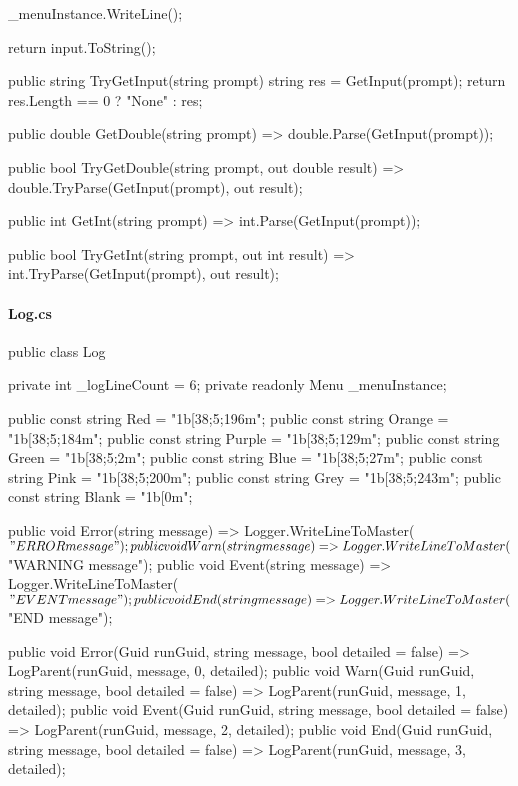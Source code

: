 \begin{flushleft}
\begin{cscode}
{{        _menuInstance.WriteLine();

        return input.ToString();
    }

    public string TryGetInput(string prompt)
    {
        string res = GetInput(prompt);
        return res.Length == 0 ? "None" : res;
    }

    public double GetDouble(string prompt) => double.Parse(GetInput(prompt));

    public bool TryGetDouble(string prompt, out double result) => double.TryParse(GetInput(prompt), out result);

    public int GetInt(string prompt) => int.Parse(GetInput(prompt));

    public bool TryGetInt(string prompt, out int result) => int.TryParse(GetInput(prompt), out result);
}
    \end{cscode}
    
    \paragraph{Log.cs}
    \begin{cscode}
public class Log
{
    private int _logLineCount = 6;
    private readonly Menu _menuInstance;

    public const string Red = "\x1b[38;5;196m";
    public const string Orange = "\x1b[38;5;184m";
    public const string Purple = "\x1b[38;5;129m";
    public const string Green = "\x1b[38;5;2m";
    public const string Blue = "\x1b[38;5;27m";
    public const string Pink = "\x1b[38;5;200m";
    public const string Grey = "\x1b[38;5;243m";
    public const string Blank = "\x1b[0m";

    public void Error(string message) => Logger.WriteLineToMaster($"ERROR {message}");
    public void Warn(string message) => Logger.WriteLineToMaster($"WARNING {message}");
    public void Event(string message) => Logger.WriteLineToMaster($"EVENT {message}");
    public void End(string message) => Logger.WriteLineToMaster($"END {message}");

    public void Error(Guid runGuid, string message, bool detailed = false) => LogParent(runGuid, message, 0, detailed);
    public void Warn(Guid runGuid, string message, bool detailed = false) => LogParent(runGuid, message, 1, detailed);
    public void Event(Guid runGuid, string message, bool detailed = false) => LogParent(runGuid, message, 2, detailed);
    public void End(Guid runGuid, string message, bool detailed = false) => LogParent(runGuid, message, 3, detailed);

}
\end{cscode}
\end{flushleft}
